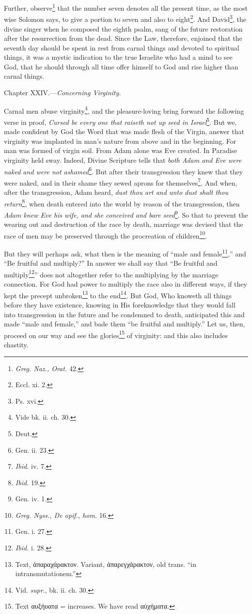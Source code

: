 Further, observe\footnote{\emph{Greg. Naz., Orat. }42.} that the number seven denotes all the present time, as the most wise Solomon says, to give a portion to seven and also to eight\footnote{Eccl. xi. 2.}. And David\footnote{Ps. xvi.}, the divine singer when he composed the eighth psalm, sang of the future restoration after the resurrection from the dead. Since the Law, therefore, enjoined that the seventh day should be spent in rest from carnal things and devoted to spiritual things, it was a mystic indication to the true Israelite who had a mind to see God, that he should through all time offer himself to God and rise higher than carnal things.


Chapter XXIV.—\emph{Concerning Virginity.}

Carnal men abuse virginity\footnote{Vide bk. ii. ch. 30.}, and the pleasure-loving bring forward the following verse in proof, \emph{Cursed be every one that raiseth not up seed in Israel}\footnote{Deut.}. But we, made confident by God the Word that was made flesh of the Virgin, answer that virginity was implanted in man’s nature from above and in the beginning. For man was formed of virgin soil. From Adam alone was Eve created. In Paradise virginity held sway. Indeed, Divine Scripture tells that \emph{both Adam and Eve were naked and were not ashamed}\footnote{Gen. ii. 23.}. But after their transgression they knew that they were naked, and in their shame they sewed aprons for themselves\footnote{\emph{Ibid. }iv. 7.}. And when, after the transgression, Adam heard, \emph{dust thou art and unto dust shalt thou return}\footnote{\emph{Ibid.} 19.}, when death entered into the world by reason of the transgression, then \emph{Adam knew Eve his wife, and she conceived and bare seed}\footnote{Gen. iv. 1.}. So that to prevent the wearing out and destruction of the race by death, marriage was devised that the race of men may be preserved through the procreation of children\footnote{\emph{Greg. Nyss., De opif., hom. }16.}.

But they will perhaps ask, what then is the meaning of “male and female\footnote{Gen. i. 27.},” and “Be fruitful and multiply?” In answer we shall say that “Be fruitful and multiply\footnote{\emph{Ibid. }i. 28.}” does not altogether refer to the multiplying by the marriage connection. For God had power to multiply the race also in different ways, if they kept the precept unbroken\footnote{Text, \textgreek{ἀπαραχάρακτον}. Variant, \textgreek{ἀπαρεγχάρακτον}, old trans. “in intransmutationem.”} to the end\footnote{Vid. \emph{supr}., bk. ii. ch. 30.}. But God, Who knoweth all things before they have existence, knowing in His foreknowledge that they would fall into transgression in the future and be condemned to death, anticipated this and made “male and female,” and bade them “be fruitful and multiply.” Let us, then, proceed on our way and see the glories\footnote{Text \textgreek{αυξήυατα} = increases. We have read \textgreek{αὐχήματα}.} of virginity: and this also includes chastity.

